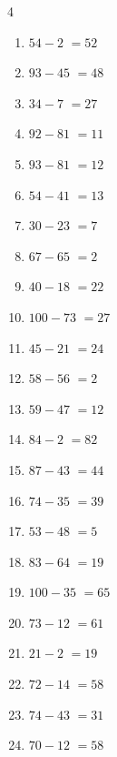 \begin{multicols}{4}
\begin{enumerate}
\resetques

  \item $54-2$
        $=52$

  \item $93-45$
        $=48$

  \item $34-7$
        $=27$

  \item $92-81$
        $=11$

  \item $93-81$
        $=12$

  \item $54-41$
        $=13$

  \item $30-23$
        $=7$

  \item $67-65$
        $=2$

  \item $40-18$
        $=22$

  \item $100-73$
        $=27$

  \item $45-21$
        $=24$

  \item $58-56$
        $=2$

  \item $59-47$
        $=12$

  \item $84-2$
        $=82$

  \item $87-43$
        $=44$

  \item $74-35$
        $=39$

  \item $53-48$
        $=5$

  \item $83-64$
        $=19$

  \item $100-35$
        $=65$

  \item $73-12$
        $=61$

  \item $21-2$
        $=19$

  \item $72-14$
        $=58$

  \item $74-43$
        $=31$

  \item $70-12$
        $=58$


\end{enumerate}
\end{multicols}
